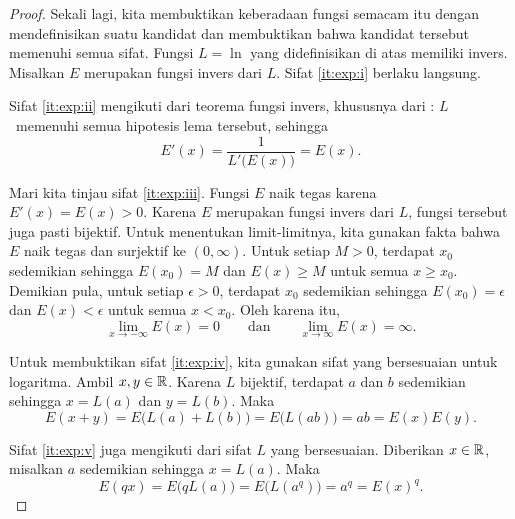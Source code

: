 \begin{proof}
Sekali lagi, kita membuktikan keberadaan fungsi semacam itu dengan mendefinisikan suatu kandidat
dan membuktikan bahwa kandidat tersebut memenuhi semua sifat.
Fungsi $L = \ln$ yang didefinisikan di atas memiliki invers.  Misalkan $E$ merupakan
fungsi invers dari $L$.  Sifat \ref{it:exp:i} berlaku langsung.

Sifat \ref{it:exp:ii} mengikuti
dari teorema fungsi invers, khususnya
dari :  $L$~memenuhi
semua hipotesis lema tersebut, sehingga
\begin{equation*}
E'(x) = \frac{1}{L'\bigl(E(x)\bigr)} = E(x) .
\end{equation*}

Mari kita tinjau sifat \ref{it:exp:iii}.
Fungsi $E$ naik tegas karena
$E'(x) = E(x) > 0$.  Karena $E$ merupakan fungsi invers dari $L$, fungsi tersebut juga pasti
bijektif.
Untuk menentukan limit-limitnya, kita gunakan fakta bahwa
$E$ naik tegas dan surjektif ke $(0,\infty)$.
Untuk setiap $M > 0$, terdapat $x_0$ sedemikian sehingga
$E(x_0) = M$ dan $E(x) \geq M$ untuk semua $x \geq x_0$.
Demikian pula, untuk setiap $\epsilon > 0$, terdapat
$x_0$ sedemikian sehingga $E(x_0) = \epsilon$ dan
$E(x) < \epsilon$ untuk semua $x < x_0$.
Oleh karena itu,
\begin{equation*}
\lim_{x\to -\infty} E(x) = 0 \qquad \text{dan} \qquad
\lim_{x\to \infty} E(x) = \infty .
\end{equation*}

Untuk membuktikan sifat \ref{it:exp:iv}, kita gunakan sifat yang bersesuaian
untuk logaritma.
Ambil $x, y \in {\mathbb{R}}$.
Karena $L$ bijektif, terdapat $a$ dan $b$ sedemikian sehingga $x = L(a)$ dan $y = L(b)$.  Maka
\begin{equation*}
E(x+y) =
E\bigl(L(a)+L(b)\bigr) = 
E\bigl(L(ab)\bigr) = ab = E(x)E(y)  .
\end{equation*}

Sifat \ref{it:exp:v} juga mengikuti dari sifat $L$ yang bersesuaian.
Diberikan $x \in {\mathbb{R}}$, misalkan $a$ sedemikian sehingga $x = L(a)$.  Maka
\begin{equation*}
E(qx) = E\bigl(qL(a)\bigr)
=
E\bigl(L(a^q)\bigr) = a^q = {E(x)}^q .
\end{equation*}


\end{proof}
